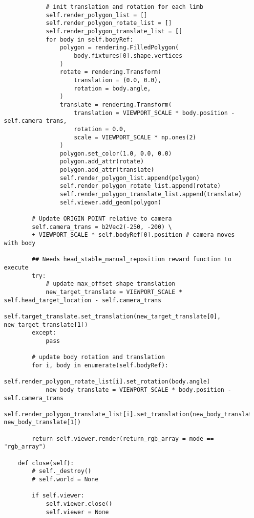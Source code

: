 \begin{lstlisting}
            # init translation and rotation for each limb
            self.render_polygon_list = []
            self.render_polygon_rotate_list = []
            self.render_polygon_translate_list = []
            for body in self.bodyRef:
                polygon = rendering.FilledPolygon(
                    body.fixtures[0].shape.vertices
                )
                rotate = rendering.Transform(
                    translation = (0.0, 0.0),
                    rotation = body.angle,
                )
                translate = rendering.Transform(
                    translation = VIEWPORT_SCALE * body.position - self.camera_trans,
                    rotation = 0.0,
                    scale = VIEWPORT_SCALE * np.ones(2)
                )
                polygon.set_color(1.0, 0.0, 0.0)
                polygon.add_attr(rotate)
                polygon.add_attr(translate)
                self.render_polygon_list.append(polygon)
                self.render_polygon_rotate_list.append(rotate)
                self.render_polygon_translate_list.append(translate)
                self.viewer.add_geom(polygon)

        # Update ORIGIN POINT relative to camera
        self.camera_trans = b2Vec2(-250, -200) \
        + VIEWPORT_SCALE * self.bodyRef[0].position # camera moves with body

        ## Needs head_stable_manual_reposition reward function to execute
        try:
            # update max_offset shape translation
            new_target_translate = VIEWPORT_SCALE * self.head_target_location - self.camera_trans
            self.target_translate.set_translation(new_target_translate[0], new_target_translate[1])
        except:
            pass

        # update body rotation and translation
        for i, body in enumerate(self.bodyRef):
            self.render_polygon_rotate_list[i].set_rotation(body.angle)
            new_body_translate = VIEWPORT_SCALE * body.position - self.camera_trans
            self.render_polygon_translate_list[i].set_translation(new_body_translate[0], new_body_translate[1])

        return self.viewer.render(return_rgb_array = mode == "rgb_array")

    def close(self):
        # self._destroy()
        # self.world = None

        if self.viewer:
            self.viewer.close()
            self.viewer = None
\end{lstlisting}
